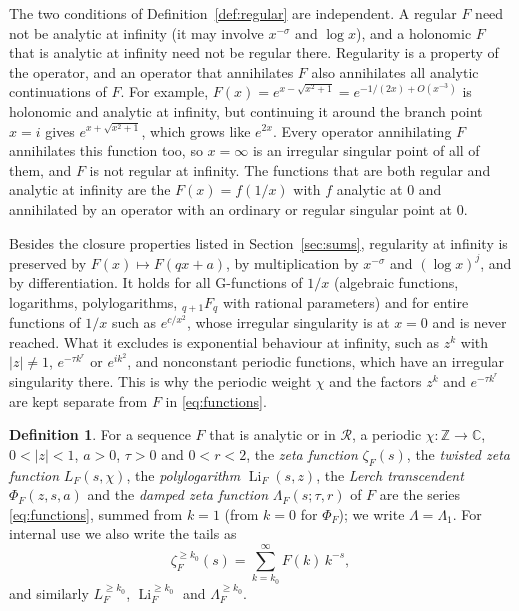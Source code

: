 \documentclass[11pt,reqno]{amsart}
\theoremstyle{definition}
\newtheorem{definition}[theorem]{Definition}
\theoremstyle{remark}
\newcommand{\Li}{\operatorname{Li}}
\newcommand{\Reg}{\mathcal{R}}
\newcommand{\ZZ}{\mathbb{Z}}
\newcommand{\CC}{\mathbb{C}}
\begin{document}
The two conditions of Definition~\ref{def:regular} are independent. A regular $F$ need not be analytic at infinity
(it may involve $x^{-\sigma}$ and $\log x$), and a holonomic $F$ that is analytic at infinity need not be regular
there. Regularity is a property of the operator, and an operator that annihilates $F$ also annihilates all analytic
continuations of $F$. For example, $F(x) = e^{x-\sqrt{x^2+1}} = e^{-1/(2x) + O(x^{-3})}$ is holonomic and analytic at
infinity, but continuing it around the branch point $x = i$ gives $e^{x+\sqrt{x^2+1}}$, which grows like $e^{2x}$.
Every operator annihilating $F$ annihilates this function too, so $x = \infty$ is an irregular singular point of all
of them, and $F$ is not regular at infinity. The functions that are both regular and analytic at infinity are the
$F(x) = f(1/x)$ with $f$ analytic at $0$ and annihilated by an operator with an ordinary or regular singular point
at $0$.

Besides the closure properties listed in Section~\ref{sec:sums}, regularity at infinity is preserved by
$F(x) \mapsto F(qx+a)$, by multiplication by $x^{-\sigma}$ and $(\log x)^j$, and by differentiation. It holds for all G-functions of $1/x$ (algebraic functions,
logarithms, polylogarithms, ${}_{q+1}F_q$ with rational parameters) and for entire functions of $1/x$ such as
$e^{c/x^2}$, whose irregular singularity is at $x = 0$ and is never reached. What it excludes is exponential
behaviour at infinity, such as $z^k$ with $|z| \ne 1$, $e^{-\tau k^r}$ or $e^{ik^2}$, and nonconstant periodic
functions, which have an irregular singularity there. This is why the periodic weight $\chi$ and the factors $z^k$
and $e^{-\tau k^r}$ are kept separate from $F$ in \eqref{eq:functions}.

\begin{definition}\label{def:functions}
For a sequence $F$ that is analytic or in $\Reg$, a periodic $\chi\colon\ZZ \to \CC$, $0 < |z| < 1$, $a > 0$,
$\tau > 0$ and $0 < r < 2$, the \emph{zeta function} $\zeta_F(s)$, the \emph{twisted zeta function} $L_F(s,\chi)$, the
\emph{polylogarithm} $\Li_F(s,z)$, the \emph{Lerch transcendent} $\Phi_F(z,s,a)$ and the \emph{damped zeta function}
$\Lambda_F(s;\tau,r)$ of $F$ are the series \eqref{eq:functions}, summed from $k = 1$ (from $k = 0$ for
$\Phi_F$); we write $\Lambda = \Lambda_1$. For internal use we also write the tails as
\[
  \zeta_F^{\ge k_0}(s) = \sum_{k=k_0}^{\infty}F(k)\,k^{-s},
\]
and similarly $L_F^{\ge k_0}$, $\Li_F^{\ge k_0}$ and $\Lambda_F^{\ge k_0}$.
\end{definition}
\end{document}
